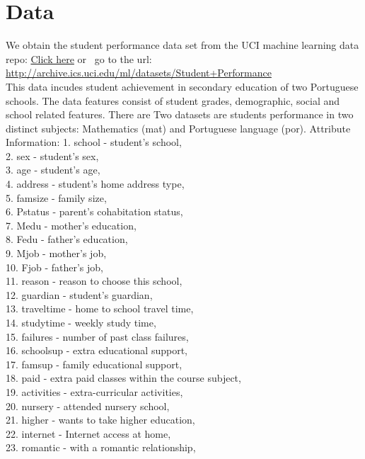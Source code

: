 \documentclass{article}
\begin{document}
\section{Data}
We obtain the student performance data set from the UCI machine learning data repo: \href{http://archive.ics.uci.edu/ml/datasets/Student+Performance}{Click here} or \
go to the url: \url{http://archive.ics.uci.edu/ml/datasets/Student+Performance}\\
\newline
This data incudes student achievement in secondary education of two Portuguese schools. The data features consist of student grades, demographic, social and school related features. There are Two datasets are students performance in two distinct subjects: Mathematics (mat) and Portuguese language (por). Attribute Information: 
1. school - student's school, \\
2. sex - student's sex,\\
3. age - student's age, \\
4. address - student's home address type,\\ 
5. famsize - family size, \\
6. Pstatus - parent's cohabitation status,\\ 
7. Medu - mother's education,\\
8. Fedu - father's education,\\
9. Mjob - mother's job, \\
10. Fjob - father's job, \\
11. reason - reason to choose this school, \\
12. guardian - student's guardian, \\
13. traveltime - home to school travel time,\\
14. studytime - weekly study time, \\
15. failures - number of past class failures,\\ 
16. schoolsup - extra educational support, \\
17. famsup - family educational support,\\
18. paid - extra paid classes within the course subject, \\
19. activities - extra-curricular activities,\\
20. nursery - attended nursery school, \\
21. higher - wants to take higher education,\\ 
22. internet - Internet access at home, \\
23. romantic - with a romantic relationship,\\ 
\end{document}
